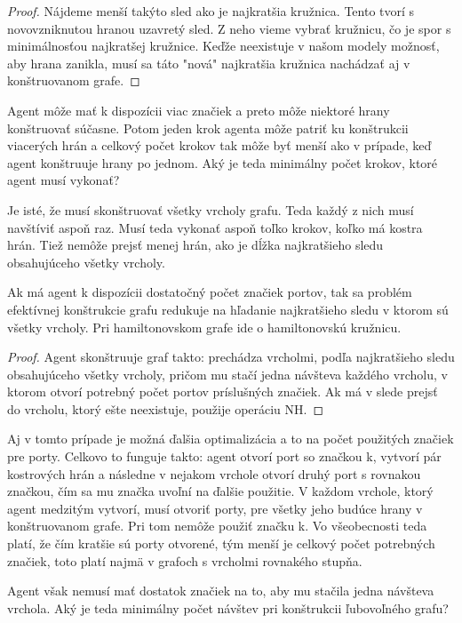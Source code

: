 \begin{proof}
Nájdeme menší takýto sled ako je najkratšia kružnica. Tento tvorí s
novovzniknutou hranou uzavretý sled. Z neho vieme vybrať
kružnicu, čo je spor s minimálnosťou najkratšej kružnice. Keďže neexistuje v
našom modely možnosť, aby hrana zanikla, musí sa táto "nová" najkratšia
kružnica nachádzať aj v konštruovanom grafe.
\end{proof}

Agent môže mať k dispozícii viac značiek a preto môže niektoré hrany
konštruovať súčasne. Potom jeden krok agenta môže patriť ku konštrukcii
viacerých hrán a celkový počet krokov tak môže byť menší ako v prípade, keď
agent konštruuje hrany po jednom. Aký je teda minimálny počet krokov, ktoré
agent musí vykonať?

Je isté, že musí skonštruovať všetky vrcholy grafu. Teda každý z nich musí
navštíviť aspoň raz. Musí teda vykonať aspoň toľko krokov, koľko má kostra
hrán. Tiež nemôže prejsť menej hrán, ako je dĺžka najkratšieho sledu
obsahujúceho všetky vrcholy.


\begin{lem}
Ak má agent k dispozícii dostatočný počet značiek portov, 
tak sa problém efektívnej konštrukcie grafu
redukuje na hľadanie najkratšieho sledu v ktorom sú všetky vrcholy. Pri
hamiltonovskom grafe ide o hamiltonovskú kružnicu.
\end{lem}
\begin{proof}
Agent skonštruuje graf takto: prechádza vrcholmi, podľa najkratšieho sledu
obsahujúceho všetky vrcholy, pričom mu stačí jedna návšteva každého vrcholu,
 v ktorom
otvorí potrebný počet portov príslušných značiek. Ak má v slede prejsť do
vrcholu, ktorý ešte neexistuje, použije operáciu NH.
\end{proof}


Aj v tomto prípade je možná ďalšia optimalizácia a to na počet použitých
značiek pre porty. Celkovo to funguje takto: agent otvorí port so značkou k, 
vytvorí pár
kostrových hrán a následne v nejakom vrchole otvorí druhý port s rovnakou
značkou, čím sa mu značka uvoľní na ďalšie použitie. V každom vrchole, 
ktorý agent medzitým vytvorí,
musí otvoriť porty, pre všetky jeho budúce hrany v konštruovanom grafe.
 Pri tom nemôže použiť značku k. Vo všeobecnosti
teda platí, že čím kratšie sú porty otvorené, tým menší je celkový počet
potrebných značiek, toto platí najmä v grafoch s vrcholmi rovnakého stupňa.

Agent však nemusí mať dostatok značiek na to, aby mu stačila jedna návšteva
vrchola. Aký je teda minimálny počet návštev pri konštrukcii ľubovoľného
grafu?

